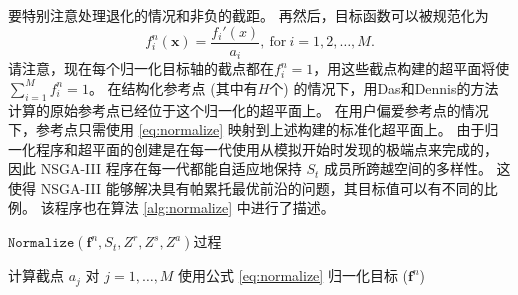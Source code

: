 要特别注意处理退化的情况和非负的截距。%
再然后，目标函数可以被规范化为
\begin{equation}\label{eq:normalize}
    f_i^n (\mathbf{x})= \frac{f_i'(x)}{a_i},\ \mathrm{for}\ i = 1, 2, \dots, M.
\end{equation}
请注意，现在每个归一化目标轴的截点都在$f_i^n = 1$，用这些截点构建的超平面将使$\sum^M_{i=1} f_i^n = 1$。
在结构化参考点 (其中有$H$个) 的情况下，用Das和Dennis\cite{das&dennis1998}的方法计算的原始参考点已经位于这个归一化的超平面上。%
在用户偏爱参考点的情况下，参考点只需使用 \ref{eq:normalize} 映射到上述构建的标准化超平面上。%
由于归一化程序和超平面的创建是在每一代使用从模拟开始时发现的极端点来完成的，%
因此 NSGA-III 程序在每一代都能自适应地保持 $S_t$ 成员所跨越空间的多样性。%
这使得 NSGA-III 能够解决具有帕累托最优前沿的问题，其目标值可以有不同的比例。%
该程序也在算法 \ref{alg:normalize} 中进行了描述。
\begin{algorithm}
    \caption{$\mathtt{Normalize}(\mathbf{f}^n, S_t, Z^r, Z^s, Z^a)$过程}\label{alg:normalize}


    计算截点 $a_j$ 对 $j = 1, \dots, M$
    使用公式 \ref{eq:normalize} 归一化目标 ($\mathbf{f}^n$)

\end{algorithm}
